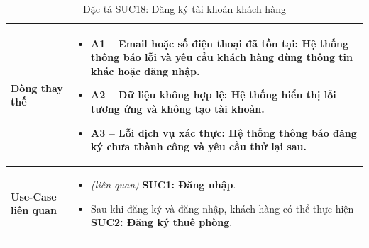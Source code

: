 \begin{table}[H]
\begin{tabularx}{\textwidth}{|>{\centering\arraybackslash\bfseries}m{3.5cm}|X|}
    \hline
    Dòng thay thế &
    \begin{itemize}[leftmargin=*, nosep, label=-]
        \vspace{0.1cm}
        \item \textbf{A1 -- Email hoặc số điện thoại đã tồn tại:} Hệ thống thông báo lỗi và yêu cầu khách hàng dùng thông tin khác hoặc đăng nhập.
        \item \textbf{A2 -- Dữ liệu không hợp lệ:} Hệ thống hiển thị lỗi tương ứng và không tạo tài khoản.
        \item \textbf{A3 -- Lỗi dịch vụ xác thực:} Hệ thống thông báo đăng ký chưa thành công và yêu cầu thử lại sau.
    \end{itemize} \\
    \hline
    Use-Case liên quan &
    \begin{itemize}[leftmargin=*, nosep, label=-]
        \vspace{0.1cm}
        \item \textit{(liên quan)} \textbf{SUC1: Đăng nhập}.
        \item Sau khi đăng ký và đăng nhập, khách hàng có thể thực hiện \textbf{SUC2: Đăng ký thuê phòng}.
\end{itemize} \\
    \hline
\end{tabularx}
\caption{Đặc tả SUC18: Đăng ký tài khoản khách hàng}
\end{table}


\vspace{1cm}

